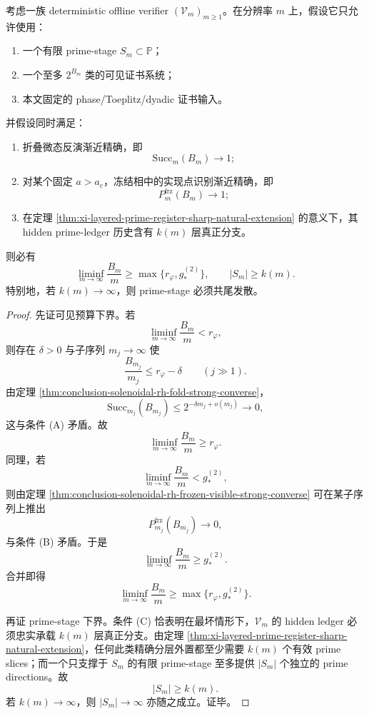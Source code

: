 \begin{theorem}\label{thm:conclusion-solenoidal-rh-double-budget-lower-bound}
考虑一族 deterministic offline verifier \((\mathcal V_m)_{m\ge 1}\)。在分辨率 \(m\) 上，假设它只允许使用：
\begin{enumerate}
  \item 一个有限 prime-stage \(S_m\subset\mathbb P\)；
  \item 一个至多 \(2^{B_m}\) 类的可见证书系统；
  \item 本文固定的 phase/Toeplitz/dyadic 证书输入。
\end{enumerate}
并假设同时满足：
\begin{enumerate}
  \item[(A)] 折叠微态反演渐近精确，即
  \[
  \mathrm{Succ}_m(B_m)\longrightarrow 1;
  \]
  \item[(B)] 对某个固定 \(a>a_{\mathrm c}\)，冻结相中的实现点识别渐近精确，即
  \[
  P_m^{\mathrm{frz}}(B_m)\longrightarrow 1;
  \]
  \item[(C)] 在定理 \ref{thm:xi-layered-prime-register-sharp-natural-extension} 的意义下，其 hidden prime-ledger 历史含有 \(k(m)\) 层真正分支。
\end{enumerate}
则必有
\[
\liminf_{m\to\infty}\frac{B_m}{m}\ge \max\!\bigl\{r_\varphi,g_*^{(2)}\bigr\},
\qquad
|S_m|\ge k(m).
\]
特别地，若 \(k(m)\to\infty\)，则 prime-stage 必须共尾发散。
\end{theorem}
\begin{proof}
先证可见预算下界。若
\[
\liminf_{m\to\infty}\frac{B_m}{m}<r_\varphi,
\]
则存在 \(\delta>0\) 与子序列 \(m_j\to\infty\) 使
\[
\frac{B_{m_j}}{m_j}\le r_\varphi-\delta
\qquad (j\gg 1).
\]
由定理 \ref{thm:conclusion-solenoidal-rh-fold-strong-converse}，
\[
\mathrm{Succ}_{m_j}(B_{m_j})\le 2^{-\delta m_j+o(m_j)}\to 0,
\]
这与条件 (A) 矛盾。故
\[
\liminf_{m\to\infty}\frac{B_m}{m}\ge r_\varphi.
\]
同理，若
\[
\liminf_{m\to\infty}\frac{B_m}{m}<g_*^{(2)},
\]
则由定理 \ref{thm:conclusion-solenoidal-rh-frozen-visible-strong-converse} 可在某子序列上推出
\[
P_{m_j}^{\mathrm{frz}}(B_{m_j})\to 0,
\]
与条件 (B) 矛盾。于是
\[
\liminf_{m\to\infty}\frac{B_m}{m}\ge g_*^{(2)}.
\]
合并即得
\[
\liminf_{m\to\infty}\frac{B_m}{m}\ge \max\!\bigl\{r_\varphi,g_*^{(2)}\bigr\}.
\]

再证 prime-stage 下界。条件 (C) 恰表明在最坏情形下，\(\mathcal V_m\) 的 hidden ledger 必须忠实承载 \(k(m)\) 层真正分支。由定理 \ref{thm:xi-layered-prime-register-sharp-natural-extension}，任何此类精确分层外置都至少需要 \(k(m)\) 个有效 prime slices；而一个只支撑于 \(S_m\) 的有限 prime-stage 至多提供 \(|S_m|\) 个独立的 prime directions。故
\[
|S_m|\ge k(m).
\]
若 \(k(m)\to\infty\)，则 \(|S_m|\to\infty\) 亦随之成立。证毕。
\end{proof}

